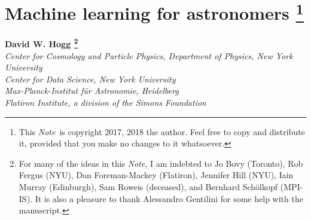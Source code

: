\documentclass[12pt, twoside, letterpaper]{article}
\newcommand{\thistitle}{Machine learning for astronomers}
\newcommand{\documentname}{\textsl{Note}}
\begin{document}
\sloppy\sloppypar\raggedbottom\frenchspacing\thispagestyle{empty} %

\section*{\thistitle%
\footnote{This \documentname\ is copyright 2017, 2018 the author. Feel free to copy and
distribute it, provided that you make no changes to it whatsoever.}}

\noindent
\textbf{David W. Hogg%
\footnote{For many of the ideas in this \documentname, I am indebted to
  Jo Bovy (Toronto),
  Rob Fergus (NYU),
  Dan Foreman-Mackey (Flatiron),
  Jennifer Hill (NYU),
  Iain Murray (Edinburgh),
  Sam Roweis (deceased),
  and
  Bernhard Sch\"olkopf (MPI-IS).
It is also a pleasure to thank
  Alessandro Gentilini for some help with the manuscript.}}\\
\textsl{\footnotesize
  Center for Cosmology and Particle Physics, Department of Physics, New York University \\
  Center for Data Science, New York University \\
  Max-Planck-Institut f\"ur Astronomie, Heidelberg \\
  Flatiron Institute, a division of the Simons Foundation}
\end{document}
